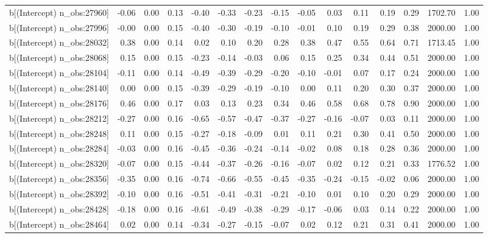 \begin{table}[ht]
\begin{tabular}{rrrrrrrrrrrrrrr}
  b[(Intercept) n\_obs:27960] & -0.06 & 0.00 & 0.13 & -0.40 & -0.33 & -0.23 & -0.15 & -0.05 & 0.03 & 0.11 & 0.19 & 0.29 & 1702.70 & 1.00 \\ 
  b[(Intercept) n\_obs:27996] & -0.00 & 0.00 & 0.15 & -0.40 & -0.30 & -0.19 & -0.10 & -0.01 & 0.10 & 0.19 & 0.29 & 0.38 & 2000.00 & 1.00 \\ 
  b[(Intercept) n\_obs:28032] & 0.38 & 0.00 & 0.14 & 0.02 & 0.10 & 0.20 & 0.28 & 0.38 & 0.47 & 0.55 & 0.64 & 0.71 & 1713.45 & 1.00 \\ 
  b[(Intercept) n\_obs:28068] & 0.15 & 0.00 & 0.15 & -0.23 & -0.14 & -0.03 & 0.06 & 0.15 & 0.25 & 0.34 & 0.44 & 0.51 & 2000.00 & 1.00 \\ 
  b[(Intercept) n\_obs:28104] & -0.11 & 0.00 & 0.14 & -0.49 & -0.39 & -0.29 & -0.20 & -0.10 & -0.01 & 0.07 & 0.17 & 0.24 & 2000.00 & 1.00 \\ 
  b[(Intercept) n\_obs:28140] & 0.00 & 0.00 & 0.15 & -0.39 & -0.29 & -0.19 & -0.10 & 0.00 & 0.11 & 0.20 & 0.30 & 0.37 & 2000.00 & 1.00 \\ 
  b[(Intercept) n\_obs:28176] & 0.46 & 0.00 & 0.17 & 0.03 & 0.13 & 0.23 & 0.34 & 0.46 & 0.58 & 0.68 & 0.78 & 0.90 & 2000.00 & 1.00 \\ 
  b[(Intercept) n\_obs:28212] & -0.27 & 0.00 & 0.16 & -0.65 & -0.57 & -0.47 & -0.37 & -0.27 & -0.16 & -0.07 & 0.03 & 0.11 & 2000.00 & 1.00 \\ 
  b[(Intercept) n\_obs:28248] & 0.11 & 0.00 & 0.15 & -0.27 & -0.18 & -0.09 & 0.01 & 0.11 & 0.21 & 0.30 & 0.41 & 0.50 & 2000.00 & 1.00 \\ 
  b[(Intercept) n\_obs:28284] & -0.03 & 0.00 & 0.16 & -0.45 & -0.36 & -0.24 & -0.14 & -0.02 & 0.08 & 0.18 & 0.28 & 0.36 & 2000.00 & 1.00 \\ 
  b[(Intercept) n\_obs:28320] & -0.07 & 0.00 & 0.15 & -0.44 & -0.37 & -0.26 & -0.16 & -0.07 & 0.02 & 0.12 & 0.21 & 0.33 & 1776.52 & 1.00 \\ 
  b[(Intercept) n\_obs:28356] & -0.35 & 0.00 & 0.16 & -0.74 & -0.66 & -0.55 & -0.45 & -0.35 & -0.24 & -0.15 & -0.02 & 0.06 & 2000.00 & 1.00 \\ 
  b[(Intercept) n\_obs:28392] & -0.10 & 0.00 & 0.16 & -0.51 & -0.41 & -0.31 & -0.21 & -0.10 & 0.01 & 0.10 & 0.20 & 0.29 & 2000.00 & 1.00 \\ 
  b[(Intercept) n\_obs:28428] & -0.18 & 0.00 & 0.16 & -0.61 & -0.49 & -0.38 & -0.29 & -0.17 & -0.06 & 0.03 & 0.14 & 0.22 & 2000.00 & 1.00 \\ 
  b[(Intercept) n\_obs:28464] & 0.02 & 0.00 & 0.14 & -0.34 & -0.27 & -0.15 & -0.07 & 0.02 & 0.12 & 0.21 & 0.31 & 0.41 & 2000.00 & 1.00 \\ 

\end{tabular}
\end{table}
